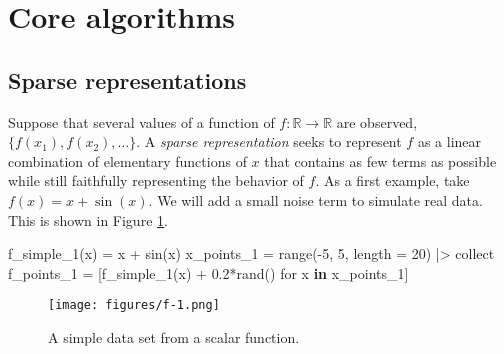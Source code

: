 \documentclass[
]{article}
\newenvironment{Shaded}{\begin{snugshade}}{\end{snugshade}}
\newcommand{\FloatTok}[1]{\textcolor[rgb]{0.68,0.00,0.00}{#1}}
\newcommand{\FunctionTok}[1]{\textcolor[rgb]{0.28,0.35,0.67}{#1}}
\newcommand{\KeywordTok}[1]{\textcolor[rgb]{0.00,0.23,0.31}{\textbf{#1}}}
\newcommand{\NormalTok}[1]{\textcolor[rgb]{0.00,0.23,0.31}{#1}}
\newcommand{\OperatorTok}[1]{\textcolor[rgb]{0.37,0.37,0.37}{#1}}
\begin{document}
\section{Core algorithms}\label{core-algorithms}

\subsection{Sparse representations}\label{sparse-representations}

Suppose that several values of a function of
\(f : \mathbb{R} \to \mathbb{R}\) are observed,
\(\{f(x_1), f(x_2), \dots \}\). A \emph{sparse representation} seeks to
represent \(f\) as a linear combination of elementary functions of \(x\)
that contains as few terms as possible while still faithfully
representing the behavior of \(f\). As a first example, take
\(f(x) = x + \sin(x)\). We will add a small noise term to simulate real
data. This is shown in Figure \ref{fig:f-1}.

\begin{Shaded}
\begin{Highlighting}[]
\FunctionTok{f\_simple\_1}\NormalTok{(x) }\OperatorTok{=}\NormalTok{ x }\OperatorTok{+} \FunctionTok{sin}\NormalTok{(x)}
\NormalTok{x\_points\_1 }\OperatorTok{=} \FunctionTok{range}\NormalTok{(}\OperatorTok{{-}}\FloatTok{5}\NormalTok{, }\FloatTok{5}\NormalTok{, length }\OperatorTok{=} \FloatTok{20}\NormalTok{) }\OperatorTok{|\textgreater{}}\NormalTok{ collect}
\NormalTok{f\_points\_1 }\OperatorTok{=}\NormalTok{ [}\FunctionTok{f\_simple\_1}\NormalTok{(x) }\OperatorTok{+} \FloatTok{0.2}\FunctionTok{*rand}\NormalTok{() for x }\KeywordTok{in}\NormalTok{ x\_points\_1]}
\end{Highlighting}
\end{Shaded}

\begin{figure}
    \centering
    \texttt{[image: figures/f-1.png]}
    \caption{A simple data set from a scalar function.}
    \label{fig:f-1}
\end{figure}
\end{document}
